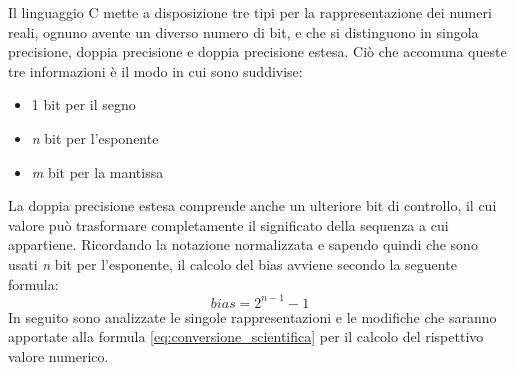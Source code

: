 \documentclass[Lau, oneside]{sapthesis}%
\begin{document}
\newpage
Il linguaggio C mette a disposizione tre tipi per la rappresentazione dei numeri reali, ognuno avente un diverso numero di bit, e che si distinguono in singola precisione, doppia precisione e doppia precisione estesa.
\newline
Ciò che accomuna queste tre informazioni è il modo in cui sono suddivise:
\begin{itemize}
    \item 1 bit per il segno
    \item \textit{n} bit per l'esponente
    \item \textit{m} bit per la mantissa
\end{itemize}
La doppia precisione estesa comprende anche un ulteriore bit di controllo, il cui valore può trasformare completamente il significato della sequenza a cui appartiene.
\newline \newline
Ricordando la notazione normalizzata e sapendo quindi che sono usati \textit{n} bit per l'esponente, il calcolo del bias avviene secondo la seguente formula:
\ \\
\begin{equation}
    bias = 2^{n-1}-1
    \label{eq:bias}
\end{equation}
\newline \newline
In seguito sono analizzate le singole rappresentazioni e le modifiche che saranno apportate alla formula \eqref{eq:conversione_scientifica} per il calcolo del rispettivo valore numerico.










\newpage
\end{document}
